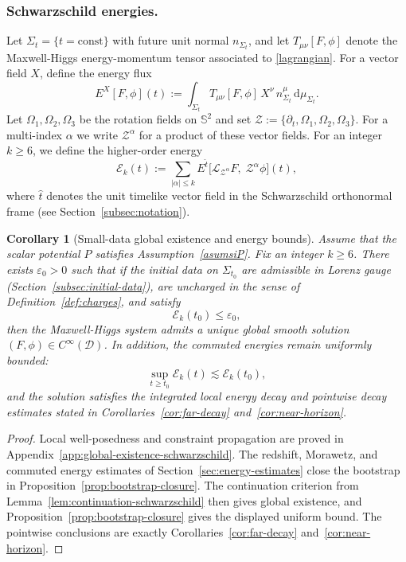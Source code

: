 \documentclass[11pt]{article}
\numberwithin{equation}{section}
\theoremstyle{plain}
\newtheorem{corollary}[theorem]{Corollary}
\theoremstyle{definition}
\theoremstyle{remark}
\newcommand{\D}{\mathcal{D}}
\newcommand{\dd}{\mathrm{d}}
\begin{document}
\subsubsection*{Schwarzschild energies.}
Let $\Sigma_t=\{t=\mathrm{const}\}$ with future unit normal $n_{\Sigma_t}$, and let $T_{\mu\nu}[F,\phi]$ denote the Maxwell-Higgs energy-momentum tensor associated to \eqref{lagrangian}.
For a vector field $X$, define the energy flux
\begin{equation}
E^{X}[F,\phi](t):=\int_{\Sigma_t} T_{\mu\nu}[F,\phi]\,X^\nu\,n_{\Sigma_t}^{\mu}\,\dd\mu_{\Sigma_t}.
\end{equation}
Let $\Omega_1,\Omega_2,\Omega_3$ be the rotation fields on $\mathbb{S}^2$ and set
$\mathcal{Z}:=\{\partial_t,\Omega_1,\Omega_2,\Omega_3\}$.
For a multi-index $\alpha$ we write $\mathcal{Z}^\alpha$ for a product of these vector fields.
For an integer $k\ge 6$, we define the higher-order energy
\begin{equation}\label{def:Ek}
\mathcal{E}_k(t)
:=
\sum_{|\alpha|\le k}
E^{\hat t}\!\big[\mathcal{L}_{\mathcal{Z}^{\alpha}}F,\;\mathcal{Z}^{\alpha}\phi\big](t),
\end{equation}
where $\hat t$ denotes the unit timelike vector field in the Schwarzschild orthonormal frame (see Section~\ref{subsec:notation}).




\begin{corollary}[Small-data global existence and energy bounds]\label{cor:small-data}
Assume that the scalar potential $P$ satisfies Assumption~\ref{asumsiP}.
Fix an integer $k\ge 6$.
There exists $\varepsilon_0>0$ such that if the initial data on $\Sigma_{t_0}$ are admissible in Lorenz gauge (Section~\ref{subsec:initial-data}), are uncharged in the sense of Definition~\ref{def:charges}, and satisfy
\begin{equation}\label{eq:smallness-energy}
\mathcal{E}_k(t_0)\le \varepsilon_0,
\end{equation}
then the Maxwell-Higgs system admits a unique global smooth solution $(F,\phi)\in C^\infty(\D)$.
In addition, the commuted energies remain uniformly bounded:
\begin{equation}
\sup_{t\ge t_0}\mathcal{E}_k(t)\lesssim \mathcal{E}_k(t_0),
\end{equation}
and the solution satisfies the integrated local energy decay and pointwise decay estimates stated in Corollaries~\ref{cor:far-decay} and~\ref{cor:near-horizon}.
\end{corollary}
\begin{proof}
Local well-posedness and constraint propagation are proved in Appendix~\ref{app:global-existence-schwarzschild}.  The redshift, Morawetz, and commuted energy estimates of Section~\ref{sec:energy-estimates} close the bootstrap in Proposition~\ref{prop:bootstrap-closure}.  The continuation criterion from Lemma~\ref{lem:continuation-schwarzschild} then gives global existence, and Proposition~\ref{prop:bootstrap-closure} gives the displayed uniform bound.  The pointwise conclusions are exactly Corollaries~\ref{cor:far-decay} and~\ref{cor:near-horizon}.
\end{proof}
\end{document}
